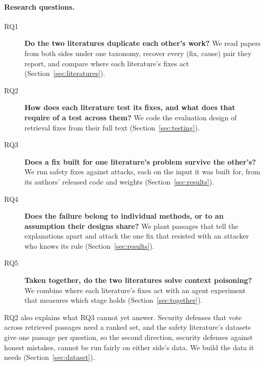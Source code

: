 \paragraph{Research questions.}
\begin{description}
\item[RQ1] \textbf{Do the two literatures duplicate each other's work?} We
  read \NCorpus{} papers from both sides under one taxonomy, recover every
  (fix, cause) pair they report, and compare where each literature's fixes
  act (Section~\ref{sec:literatures}).
\item[RQ2] \textbf{How does each literature test its fixes, and what does that
  require of a test across them?} We code the evaluation design of
  \NDesignFixes{} retrieval fixes from their full text
  (Section~\ref{sec:testing}).
\item[RQ3] \textbf{Does a fix built for one literature's problem survive the
  other's?} We run safety fixes against attacks, each on the input it was
  built for, from its authors' released code and weights
  (Section~\ref{sec:results}).
\item[RQ4] \textbf{Does the failure belong to individual methods, or to an
  assumption their designs share?} We plant passages that tell the
  explanations apart and attack the one fix that resisted with an attacker
  who knows its rule (Section~\ref{sec:results}).
\item[RQ5] \textbf{Taken together, do the two literatures solve context
  poisoning?} We combine where each literature's fixes act with an agent
  experiment that measures which stage holds (Section~\ref{sec:together}).
\end{description}

RQ2 also explains what RQ3 cannot yet answer. Security defenses that vote
across retrieved passages need a ranked set, and the safety literature's
datasets give one passage per question, so the second direction, security
defenses against honest mistakes, cannot be run fairly on either side's
data. We build the data it needs (Section~\ref{sec:dataset}).


